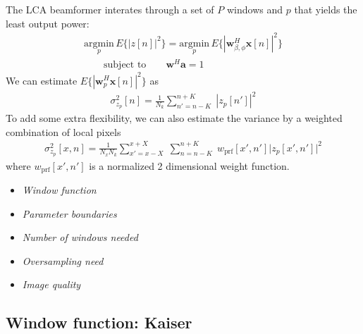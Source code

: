 \documentclass[10pt,journal,draftclsnofoot,onecolumn]{IEEEtran}
\newcommand\argmin[1]{\text{arg}\;\underset{#1}{\text{min}}}
\newcommand\sumb[2]{\sum\limits_{#1}^{#2}\;}
\renewcommand\H{^{\scriptscriptstyle H}}
\renewcommand\vec[1]{\boldsymbol{#1}}
\newcommand\1{\vec 1}
\renewcommand*\a{\vec a}
\newcommand*\w{\vec w}
\newcommand*\x{\vec x}
\renewcommand\argmin{\text{argmin}}
\begin{document}
The LCA beamformer interates through a set of $P$ windows and $p$ that yields the least output power:
%
\begin{align}
\underset{p}{\argmin}\, E\{|z[n]|^2\} = \underset{p}{\argmin}\, E\big\{|\w_{\beta,\phi}\H\x[n]|^2\big\}\\
\qquad\text{subject to}\qquad \w\H\a = 1\label{eq_lca_constraint}
\end{align}\label{lca_criterion}
%
We can estimate $E\big\{|\w_p\H\x[n]|^2\big\}$ as
%
\begin{align*}
\sigma^2_{z_p}[n] = \frac{1}{N_k} \sumb{n'=n-K}{n+K} | z_p[n'] |^2
\end{align*}
%
To add some extra flexibility, we can also estimate the variance by a weighted combination of local pixels
%
\begin{align*}
\sigma^2_{z_p}[x,n] = \frac{1}{N_x N_k} \sumb{x'=x-X}{x+X} \sumb{n=n-K}{n+K} w_\text{prf}[x',n']\big| z_p[x',n'] \big|^2
\end{align*}
%
where $w_\text{prf}[x',n']$ is a normalized 2 dimensional weight function. 

\begin{itemize}
\item \emph{Window function}
\item \emph{Parameter boundaries}
\item \emph{Number of windows needed}
\item \emph{Oversampling need}
\item \emph{Image quality}
\end{itemize}


\subsection{Window function: Kaiser}\label{kaiser_windows}
\end{document}
